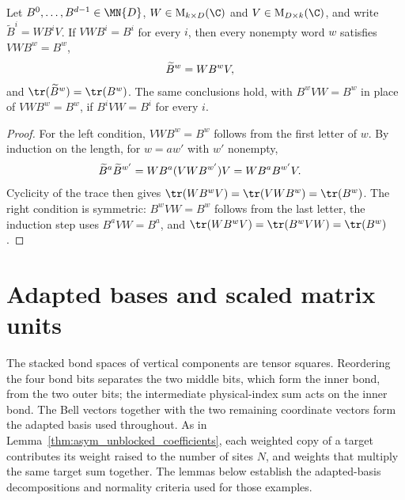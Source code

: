 \begin{lemma}
    \label{lem:asymex_absorbing_compression}
    \leanok
    Let $B^0,\ldots,B^{d-1}\in\MN{D}$, $W\in\mathrm{M}_{k\times D}(\C)$ and
    $V\in\mathrm{M}_{D\times k}(\C)$, and write $\widetilde B^i=WB^iV$.
    If $VWB^i=B^i$ for every $i$, then every nonempty word $w$ satisfies
    $VWB^w=B^w$,
    \begin{align}
        \widetilde B^w & =WB^wV,
        \notag
    \end{align}
    and $\tr(\widetilde B^w)=\tr(B^w)$. The same conclusions hold, with
    $B^wVW=B^w$ in place of $VWB^w=B^w$, if $B^iVW=B^i$ for every $i$.
\end{lemma}

\begin{proof}
    \leanok
    For the left condition, $VWB^w=B^w$ follows from the first letter of
    $w$. By induction on the length, for $w=aw'$ with $w'$ nonempty,
    \begin{align}
        \widetilde B^a\widetilde B^{w'}
         & =WB^a(VWB^{w'})V=WB^aB^{w'}V.
        \notag
    \end{align}
    Cyclicity of the trace then gives
    $\tr(WB^wV)=\tr(VWB^w)=\tr(B^w)$. The right condition is symmetric:
    $B^wVW=B^w$ follows from the last letter, the induction step uses
    $B^aVW=B^a$, and $\tr(WB^wV)=\tr(B^wVW)=\tr(B^w)$.
\end{proof}

\section{Adapted bases and scaled matrix units}%
\label{sec:asymex_rfp_basis}

The stacked bond spaces of vertical components are tensor squares.
Reordering the four bond bits separates the two middle bits, which form
the inner bond, from the two outer bits; the intermediate
physical-index sum acts on the inner bond. The Bell vectors together with
the two remaining coordinate vectors form the adapted basis used
throughout. As in Lemma~\ref{thm:asym_unblocked_coefficients}, each weighted copy of a
target contributes its weight raised to the number of sites $N$, and weights
that multiply the same target sum together. The lemmas
below establish the adapted-basis decompositions and normality criteria used
for those examples.


